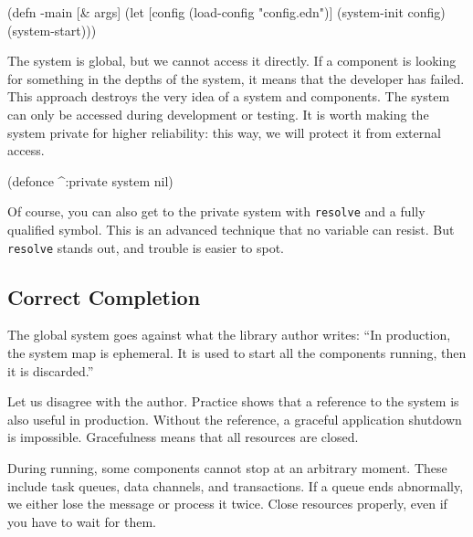 \else

\begin{english}
  \begin{clojure}
(defn -main [& args]
  (let [config (load-config "config.edn")]
    (system-init config)
    (system-start)))
  \end{clojure}
\end{english}

\fi

The system is global, but we cannot access it directly. If a component is looking for something in the depths of the system, it means that the developer has failed. This approach destroys the very idea of a system and components. The system can only be accessed during development or testing. It is worth making the system private for higher reliability: this way, we will protect it from external access.


\begin{english}
  \begin{clojure}
(defonce ^:private system nil)
  \end{clojure}
\end{english}

Of course, you can also get to the private system with \verb|resolve| and a fully qualified symbol. This is an advanced technique that no variable can resist. But \verb|resolve| stands out, and trouble is easier to spot.

\subsection{Correct Completion}


The global system goes against what the library author writes: ``In production, the system map is ephemeral. It is used to start all the components running, then it is discarded.''


Let us disagree with the author. Practice shows that a reference to the system is also useful in production. Without the reference, a graceful application shutdown is impossible. Gracefulness means that all resources are closed.

During running, some components cannot stop at an arbitrary moment. These include task queues, data channels, and transactions. If a queue ends abnormally, we either lose the message or process it twice. Close resources properly, even if you have to wait for them.

